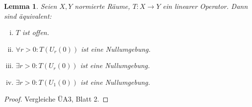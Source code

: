 \documentclass[ngerman]{report}
\theoremstyle{plain}%
\newtheorem{lemma}[thm]{Lemma}
\theoremstyle{definition}%
\theoremstyle{myStyle}
\begin{document}
	\begin{lemma}
		Seien $X,Y$ normierte Räume, $T: X\to Y$ ein linearer Operator. Dann sind äquivalent:
			\begin{enumerate}[(i)]
				\item $T$ ist offen.
				\item $\forall r > 0: T(U_r(0))$ ist eine Nullumgebung.
				\item $\exists r > 0 : T(U_r(0))$ ist eine Nullumgebung.
				\item $\exists r > 0 : T(U_1(0))$ ist eine Nullumgebung.

			\end{enumerate}
	\end{lemma}
	\begin{proof}
	 Vergleiche ÜA3, Blatt 2.
	\end{proof}
\end{document}
